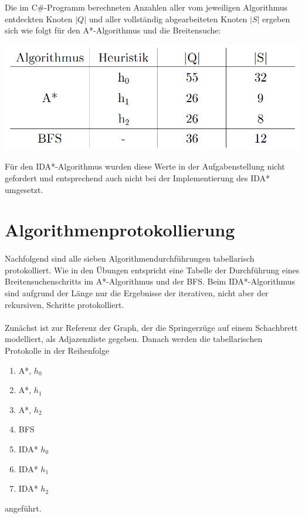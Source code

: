 Die im C\#-Programm berechneten Anzahlen aller vom jeweiligen Algorithmus entdeckten Knoten $|Q|$ und aller 
vollständig abgearbeiteten Knoten $|S|$ ergeben sich wie folgt für den A*-Algorithmus und die Breitensuche:
\begin{center}
    \includegraphics[width=0.6\linewidth]{figures/Q_S_Table.png}
\end{center}
Für den IDA*-Algorithmus wurden diese Werte in der Aufgabenstellung nicht gefordert und entsprechend auch nicht 
bei der Implementierung des IDA* umgesetzt.


\clearpage


\section{ Algorithmenprotokollierung }\label{se:protocol}
\paragraph*{}
Nachfolgend sind alle sieben Algorithmendurchführungen tabellarisch protokolliert. Wie in den Übungen entspricht
eine Tabelle der Durchführung eines Breitensuchenschritts im A*-Algorithmus und der BFS. Beim IDA*-Algorithmus 
sind aufgrund der Länge nur die Ergebnisse der iterativen, nicht aber der rekursiven, Schritte protokolliert.
\paragraph*{}
Zunächst ist zur Referenz der Graph, der die Springerzüge auf einem Schachbrett modelliert, als Adjazenzliste 
gegeben. Danach werden die tabellarischen Protokolle in der Reihenfolge
\begin{enumerate}
    \item A*, $h_0$
    \item A*, $h_1$
    \item A*, $h_2$
    \item BFS
    \item IDA* $h_0$
    \item IDA* $h_1$
    \item IDA* $h_2$
\end{enumerate}
angeführt.

